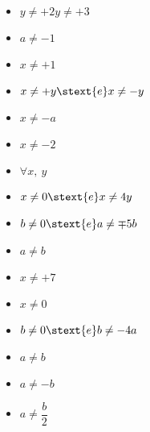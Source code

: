 \begin{esercizio}
\begin{multicols}{3}
\begin{itemize} [label={\framebox(12,12){}}]
 \item \(y \neq +2 y \neq +3\)
 \item \(a \neq -1\)
 \item \(x \neq +1\)
 \item \(x \neq +y \stext{e} x \neq -y\)
 \item \(x \neq -a\)
 \item \(x \neq -2\)
 \item \(\forall x,~y\)
 \item \(x \neq 0 \stext{e} x \neq 4y\)
 \item \(b \neq 0 \stext{e} a \neq \mp 5b\)
 \item \(a \neq b\)
 \item \(x \neq +7\)
 \item \(x \neq 0\)
 \item \(b \neq 0 \stext{e} b \neq -4a\)
 \item \(a \neq b\)
 \item \(a \neq -b\)
 \item \(a \neq \dfrac{b}{2}\)
\end{itemize}
\end{multicols}
\end{esercizio}

\subsubsection*{}

